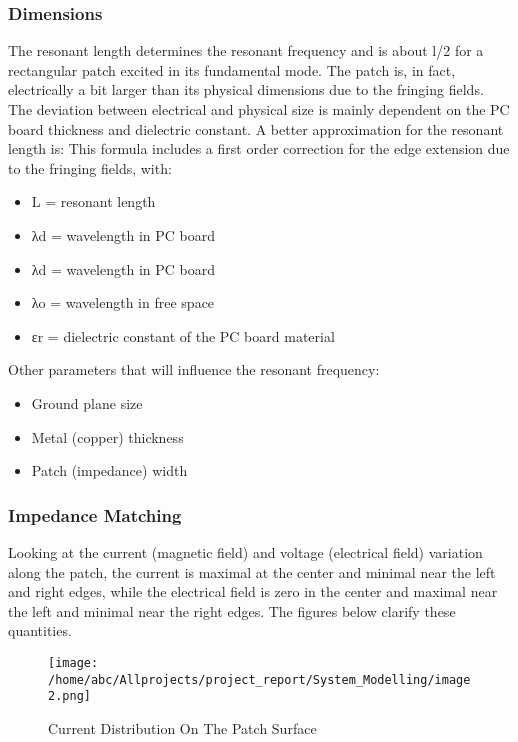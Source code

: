 \documentclass[12pt]{article}
\begin{document}
  \subsubsection{Dimensions}\label{sub:Dimensions}
	   \justify
	    The resonant length determines the resonant frequency and is about l/2 for a rectangular patch excited in its fundamental mode. The patch is, in fact, electrically a bit larger than its physical dimensions due to the fringing fields. The deviation between electrical and physical size is mainly dependent on the PC board thickness and dielectric constant.
	    A better approximation for the resonant length is:
	   \justify
	    This formula includes a first order correction for the edge extension due to the fringing fields, with:
	     \begin{itemize}
	       \item   L = resonant length
	       \item   λd = wavelength in PC board
	       \item λd = wavelength in PC board
	       \item λo = wavelength in free space
	       \item εr = dielectric constant of the PC board material

	     \end{itemize}

	     Other parameters that will influence the resonant frequency:

	     \begin{itemize}
	       \item Ground plane size
	       \item Metal (copper) thickness
	       \item  Patch (impedance) width
	     \end{itemize}

    \subsubsection{Impedance Matching}\label{sub:Impedance Matching}
     \justify
      Looking at the current (magnetic field) and voltage (electrical field) variation along the  patch, the current is maximal at the center and minimal near the left and right edges, while the electrical field is zero in the center and maximal near the left and minimal near the right edges.  The figures below clarify these quantities.

         \begin{figure}[h]
         	\centering
	         	\texttt{[image: /home/abc/Allprojects/project\_report/System\_Modelling/image2.png]}
	         	\caption{Current Distribution On The Patch Surface}
         \end{figure}
\end{document}
